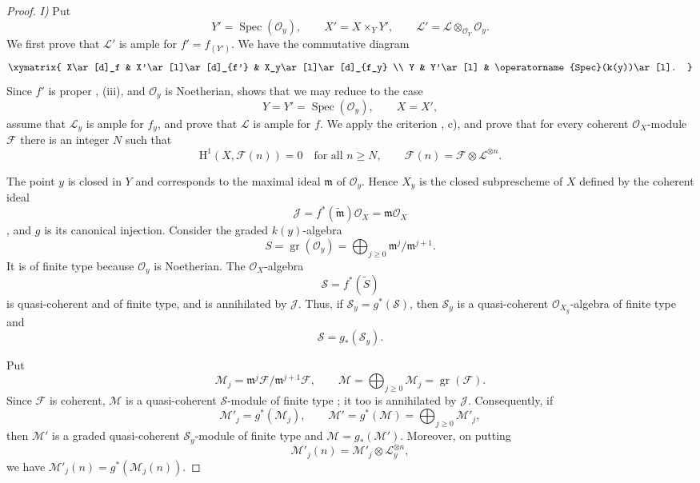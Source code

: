 \documentclass[oneside]{amsart}
\theoremstyle{ega-env-style}
\theoremstyle{ega-thm-env-style}
\theoremstyle{ega-defn-env-style}
\def\mathcal{\mathscr}
\def\sh{\mathcal}                   %
\def\geq{\geqslant}                 %
\def\HH{\mathrm{H}}                 %
\def\kres{k}                        %
\def\Spec{\operatorname{Spec}}
\newcommand{\oldpage}[2][]{{\marginnote{\normalfont{\textbf{#1}~|~#2}}}\ignorespaces}
\begin{document}
\begin{proof}
\oldpage[III]{145}

\noindent\textit{I)} Put
\[
  Y'=\Spec(\sh{O}_y),\qquad
  X'=X\times_Y Y',\qquad
  \sh{L}'=\sh{L}\otimes_{\sh{O}_Y}\sh{O}_y.
\]
We first prove that $\sh{L}'$ is ample for $f'=f_{(Y')}$.  We have
the commutative diagram
\[
  \xymatrix{
    X\ar[d]_f
      &
    X'\ar[l]\ar[d]_{f'}
      &
    X_y\ar[l]\ar[d]_{f_y}
    \\
    Y
      &
    Y'\ar[l]
      &
    \Spec(\kres(y))\ar[l].
  }
\]
Since $f'$ is proper , (iii), and $\sh{O}_y$ is
Noetherian,  shows that we may reduce to the case
\[
  Y=Y'=\Spec(\sh{O}_y),\qquad X=X',
\]
assume that $\sh{L}_y$ is ample for $f_y$, and prove that $\sh{L}$
is ample for $f$.  We apply the criterion
, c), and prove that for every coherent
$\sh{O}_X$-module $\sh{F}$ there is an integer $N$ such that
\[
  \HH^1(X,\sh{F}(n))=0
  \quad\text{for all }n\geq N,
  \qquad
  \sh{F}(n)=\sh{F}\otimes\sh{L}^{\otimes n}.
\]

The point $y$ is closed in $Y$ and corresponds to the maximal ideal
$\mathfrak m$ of $\sh{O}_y$.  Hence $X_y$ is the closed
subprescheme of $X$ defined by the coherent ideal
\[
  \sh{J}
  =
  f^*(\widetilde{\mathfrak m})\sh{O}_X
  =
  \mathfrak m\sh{O}_X
\]
, and $g$ is its canonical injection.  Consider
the graded $\kres(y)$-algebra
\[
  S=\operatorname{gr}(\sh{O}_y)
   =\bigoplus_{j\geq0}
      \mathfrak m^j/\mathfrak m^{j+1}.
\]
It is of finite type because $\sh{O}_y$ is Noetherian.  The
$\sh{O}_X$-algebra
\[
  \sh{S}=f^*(\widetilde S)
\]
is quasi-coherent and of finite type, and is annihilated by
$\sh{J}$.  Thus, if $\sh{S}_y=g^*(\sh{S})$, then $\sh{S}_y$ is a
quasi-coherent $\sh{O}_{X_y}$-algebra of finite type and
\[
  \sh{S}=g_*(\sh{S}_y).
\]

Put
\[
  \sh{M}_j
  =
  \mathfrak m^j\sh{F}/\mathfrak m^{j+1}\sh{F},
  \qquad
  \sh{M}
  =
  \bigoplus_{j\geq0}\sh{M}_j
  =
  \operatorname{gr}(\sh{F}).
\]
Since $\sh{F}$ is coherent, $\sh{M}$ is a quasi-coherent
$\sh{S}$-module of finite type ; it too is
annihilated by $\sh{J}$.  Consequently, if
\[
  \sh{M}'_j=g^*(\sh{M}_j),
  \qquad
  \sh{M}'=g^*(\sh{M})
    =\bigoplus_{j\geq0}\sh{M}'_j,
\]
then $\sh{M}'$ is a graded quasi-coherent $\sh{S}_y$-module of
finite type and $\sh{M}=g_*(\sh{M}')$.  Moreover, on putting
\[
  \sh{M}'_j(n)
  =
  \sh{M}'_j\otimes\sh{L}_y^{\otimes n},
\]
we have $\sh{M}'_j(n)=g^*(\sh{M}_j(n))$.


\end{proof}
\end{document}
